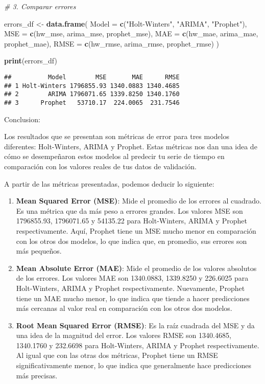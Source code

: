\documentclass[
]{book}
\newenvironment{Shaded}{\begin{snugshade}}{\end{snugshade}}
\newcommand{\AttributeTok}[1]{\textcolor[rgb]{0.13,0.29,0.53}{#1}}
\newcommand{\CommentTok}[1]{\textcolor[rgb]{0.56,0.35,0.01}{\textit{#1}}}
\newcommand{\FunctionTok}[1]{\textcolor[rgb]{0.13,0.29,0.53}{\textbf{#1}}}
\newcommand{\NormalTok}[1]{#1}
\newcommand{\OtherTok}[1]{\textcolor[rgb]{0.56,0.35,0.01}{#1}}
\newcommand{\StringTok}[1]{\textcolor[rgb]{0.31,0.60,0.02}{#1}}
\begin{document}
\begin{Shaded}
\begin{Highlighting}[]
\CommentTok{\# 3. Comparar errores}

\NormalTok{errors\_df }\OtherTok{\textless{}{-}} \FunctionTok{data.frame}\NormalTok{(}
  \AttributeTok{Model =} \FunctionTok{c}\NormalTok{(}\StringTok{"Holt{-}Winters"}\NormalTok{, }\StringTok{"ARIMA"}\NormalTok{, }\StringTok{"Prophet"}\NormalTok{),}
  \AttributeTok{MSE =} \FunctionTok{c}\NormalTok{(hw\_mse, arima\_mse, prophet\_mse),}
  \AttributeTok{MAE =} \FunctionTok{c}\NormalTok{(hw\_mae, arima\_mae, prophet\_mae),}
  \AttributeTok{RMSE =} \FunctionTok{c}\NormalTok{(hw\_rmse, arima\_rmse, prophet\_rmse)}
\NormalTok{)}

\FunctionTok{print}\NormalTok{(errors\_df)}
\end{Highlighting}
\end{Shaded}

\begin{verbatim}
##          Model        MSE       MAE      RMSE
## 1 Holt-Winters 1796855.93 1340.0883 1340.4685
## 2        ARIMA 1796071.65 1339.8250 1340.1760
## 3      Prophet   53710.17  224.0065  231.7546
\end{verbatim}

Conclusion:

Los resultados que se presentan son métricas de error para tres modelos diferentes: Holt-Winters, ARIMA y Prophet. Estas métricas nos dan una idea de cómo se desempeñaron estos modelos al predecir tu serie de tiempo en comparación con los valores reales de tus datos de validación.

A partir de las métricas presentadas, podemos deducir lo siguiente:

\begin{enumerate}
\def\labelenumi{\arabic{enumi}.}
\item
  \textbf{Mean Squared Error (MSE)}: Mide el promedio de los errores al cuadrado. Es una métrica que da más peso a errores grandes. Los valores MSE son 1796855.93, 1796071.65 y 54135.22 para Holt-Winters, ARIMA y Prophet respectivamente. Aquí, Prophet tiene un MSE mucho menor en comparación con los otros dos modelos, lo que indica que, en promedio, sus errores son más pequeños.
\item
  \textbf{Mean Absolute Error (MAE)}: Mide el promedio de los valores absolutos de los errores. Los valores MAE son 1340.0883, 1339.8250 y 226.6025 para Holt-Winters, ARIMA y Prophet respectivamente. Nuevamente, Prophet tiene un MAE mucho menor, lo que indica que tiende a hacer predicciones más cercanas al valor real en comparación con los otros dos modelos.
\item
  \textbf{Root Mean Squared Error (RMSE)}: Es la raíz cuadrada del MSE y da una idea de la magnitud del error. Los valores RMSE son 1340.4685, 1340.1760 y 232.6698 para Holt-Winters, ARIMA y Prophet respectivamente. Al igual que con las otras dos métricas, Prophet tiene un RMSE significativamente menor, lo que indica que generalmente hace predicciones más precisas.
\end{enumerate}
\end{document}
